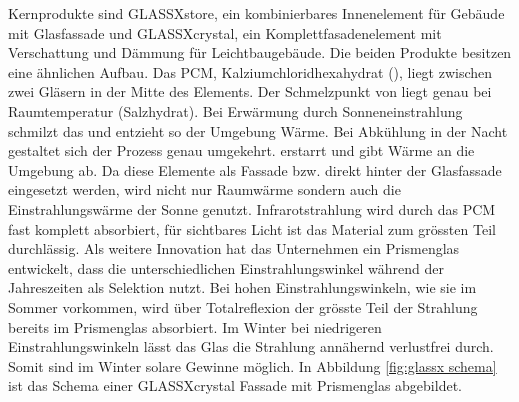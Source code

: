 \documentclass[11pt,a4paper]{scrartcl}
\begin{document}
Kernprodukte sind
GLASSX\circledR store, ein kombinierbares Innenelement für Gebäude mit
Glasfassade und GLASSX\circledR crystal, ein Komplettfasadenelement mit
Verschattung und Dämmung für Leichtbaugebäude. Die beiden Produkte besitzen eine
ähnlichen Aufbau. Das PCM, Kalziumchloridhexahydrat (),
liegt zwischen zwei Gläsern in der Mitte des Elements. Der Schmelzpunkt von
 liegt genau bei Raumtemperatur (Salzhydrat). Bei
Erwärmung durch Sonneneinstrahlung schmilzt das  und
entzieht so der Umgebung Wärme. Bei Abkühlung in der Nacht gestaltet sich der
Prozess genau umgekehrt.  erstarrt und gibt Wärme an die
Umgebung ab. Da diese Elemente als Fassade bzw. direkt hinter der Glasfassade
eingesetzt werden, wird nicht nur Raumwärme sondern auch die Einstrahlungswärme
der Sonne genutzt. Infrarotstrahlung wird durch das PCM fast komplett
absorbiert, für sichtbares Licht ist das Material zum grössten Teil durchlässig.
Als weitere Innovation hat das Unternehmen ein Prismenglas entwickelt, dass die
unterschiedlichen Einstrahlungswinkel während der Jahreszeiten als Selektion
nutzt. Bei hohen Einstrahlungswinkeln, wie sie im Sommer vorkommen, wird über
Totalreflexion der grösste Teil der Strahlung bereits im Prismenglas absorbiert.
Im Winter bei niedrigeren Einstrahlungswinkeln lässt das Glas die Strahlung
annähernd verlustfrei durch. Somit sind im Winter solare Gewinne möglich. In
Abbildung \ref{fig:glassx schema} ist das Schema einer GLASSX\circledR crystal
Fassade mit Prismenglas abgebildet. 
\end{document}
